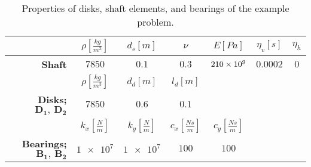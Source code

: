 \begin{table}
\caption{Properties of disks, shaft elements, and bearings of the example problem.} \label{tab:ExampleRotorTable}
\centering
\begin{tabular}{rcccccc}
						&$\rho[\frac{kg}{m^3}]$	&$d_s[m]$					&$\nu$				&$E[Pa]$			&$ \eta_v[s] $	&$ \eta_h $	\\\hline
	\textbf{Shaft}		&$7850$					&$0.1$					&$0.3$				&$\num{210E9}$		&$ 0.0002 $		&$ 0 $		\\[1em]
						&$\rho[\frac{kg}{m^3}]$	&$d_d[m]$					&$l_d[m]$				&					&				&			\\\hline
	\textbf{Disks;} $ \mathbf{D_1,\ D_2} $		&$7850$					&$0.6$					&$0.1$				&					&				&			\\[1em]
						&$k_x[\frac{N}{m}]$		&$k_y[\frac{N}{m}]$		&$c_x[\frac{Ns}{m}]$&$c_y[\frac{Ns}{m}]$&				&			\\\hline
	\textbf{Bearings;} $ \mathbf{B_1,\ B_2} $	&$\num{1e7}$			&$\num{1e7}$			&$100$				&$100$				&				&			
\end{tabular}
\centering
\end{table}
